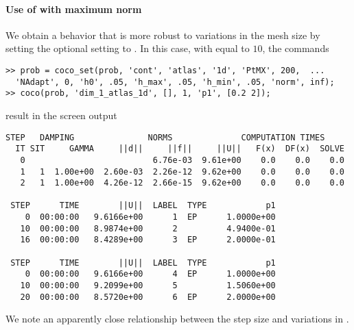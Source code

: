 \paragraph{Use of  with maximum norm}
We obtain a behavior that is more robust to variations in the mesh size by setting the optional setting  to . In this case, with  equal to $10$, the commands
\begin{lstlisting}[language=coco-highlight]
>> prob = coco_set(prob, 'cont', 'atlas', '1d', 'PtMX', 200,  ...
  'NAdapt', 0, 'h0', .05, 'h_max', .05, 'h_min', .05, 'norm', inf);
>> coco(prob, 'dim_1_atlas_1d', [], 1, 'p1', [0.2 2]);
\end{lstlisting}
result in the screen output
\begin{lstlisting}[language=coco-highlight]
    STEP   DAMPING               NORMS              COMPUTATION TIMES
  IT SIT     GAMMA     ||d||     ||f||     ||U||   F(x)  DF(x)  SOLVE
   0                          6.76e-03  9.61e+00    0.0    0.0    0.0
   1   1  1.00e+00  2.60e-03  2.26e-12  9.62e+00    0.0    0.0    0.0
   2   1  1.00e+00  4.26e-12  2.66e-15  9.62e+00    0.0    0.0    0.0

 STEP      TIME        ||U||  LABEL  TYPE            p1
    0  00:00:00   9.6166e+00      1  EP      1.0000e+00
   10  00:00:00   8.9874e+00      2          4.9400e-01
   16  00:00:00   8.4289e+00      3  EP      2.0000e-01

 STEP      TIME        ||U||  LABEL  TYPE            p1
    0  00:00:00   9.6166e+00      4  EP      1.0000e+00
   10  00:00:00   9.2099e+00      5          1.5060e+00
   20  00:00:00   8.5720e+00      6  EP      2.0000e+00
\end{lstlisting}
We note an apparently close relationship between the step size and variations in .

